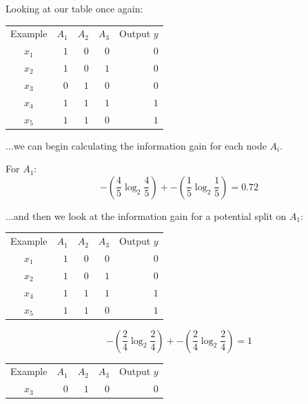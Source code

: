\documentclass{article}
\begin{document}
Looking at our table once again:

\begin{center}
    \begin{tabular}{ c r r r r }
        Example & $A_1$ & $A_2$ & $A_3$ & Output $y$\\ 
        $x_1$ & $1$ & $0$ & $0$ & $0$\\
        $x_2$ & $1$ & $0$ & $1$ & $0$\\
        $x_3$ & $0$ & $1$ & $0$ & $0$\\
        $x_4$ & $1$ & $1$ & $1$ & $1$\\
        $x_5$ & $1$ & $1$ & $0$ & $1$\\
    \end{tabular}
\end{center}

\noindent ...we can begin calculating the information gain for each node $A_i$.

\noindent For $A_1$:
\begin{equation}
    -(\frac{4}{5}\log_2{\frac{4}{5}}) + -(\frac{1}{5}\log_2{\frac{1}{5}}) = 0.72
\end{equation}

\noindent ...and then we look at the information gain for a potential split on $A_1$:

\begin{center}
    \begin{tabular}{ c r r r r }
        Example & $A_1$ & $A_2$ & $A_3$ & Output $y$\\ 
        $x_1$ & $1$ & $0$ & $0$ & $0$\\
        $x_2$ & $1$ & $0$ & $1$ & $0$\\
        $x_4$ & $1$ & $1$ & $1$ & $1$\\
        $x_5$ & $1$ & $1$ & $0$ & $1$\\
    \end{tabular}
\end{center}

\begin{equation}
    -(\frac{2}{4}\log_2{\frac{2}{4}}) + -(\frac{2}{4}\log_2{\frac{2}{4}}) = 1
\end{equation}

\begin{center}
    \begin{tabular}{ c r r r r }
        Example & $A_1$ & $A_2$ & $A_3$ & Output $y$\\ 
        $x_3$ & $0$ & $1$ & $0$ & $0$\\
    \end{tabular}
\end{center}
\end{document}
